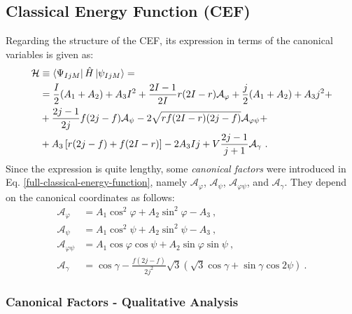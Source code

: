 \subsection{Classical Energy Function (CEF)}

Regarding the structure of the CEF, its expression in terms of the canonical variables is given as:
\begin{align}
    \mathcal{H}&\equiv\bra{\Psi_{IjM}}\hat{H}\ket{\psi_{IjM}}=\nonumber\\
    &=\frac{I}{2}(A_1+A_2)+A_3I^2+\frac{2I-1}{2I}r(2I-r)\mathcal{A}_\varphi+\frac{j}{2}(A_1+A_2)+A_3j^2+\nonumber\\
    &+\frac{2j-1}{2j}f(2j-f)\mathcal{A}_\psi-2\sqrt{rf(2I-r)(2j-f)}\mathcal{A}_{\varphi\psi}+\nonumber\\
    &+A_3\left[r(2j-f)+f(2I-r)\right]-2A_3Ij+V\frac{2j-1}{j+1}\mathcal{A}_\gamma\ .
    \label{full-classical-energy-function}
\end{align}
Since the expression is quite lengthy, some \emph{canonical factors} were introduced in Eq. \ref{full-classical-energy-function}, namely $\mathcal{A}_\varphi$, $\mathcal{A}_\psi$, $\mathcal{A}_{\varphi\psi}$, and $\mathcal{A}_\gamma$. They depend on the canonical coordinates as follows:
\begin{align}
    \mathcal{A}_\varphi&=A_1\cos^2\varphi+A_2\sin^2\varphi-A_3\ ,\nonumber\\
    \mathcal{A}_\psi&=A_1\cos^2\psi+A_2\sin^2\psi-A_3\ ,\nonumber\\
    \mathcal{A}_{\varphi\psi}&=A_1\cos\varphi\cos\psi+A_2\sin\varphi\sin\psi\ ,\nonumber\\
    \mathcal{A}_\gamma&=\cos\gamma-\frac{f(2j-f)}{2j^2}\sqrt{3}\left(\sqrt{3}\cos\gamma+\sin\gamma\cos2\psi\right)\ .
    \label{classical-energy-function-A-factors}
\end{align}

\subsubsection{Canonical Factors - Qualitative Analysis}

